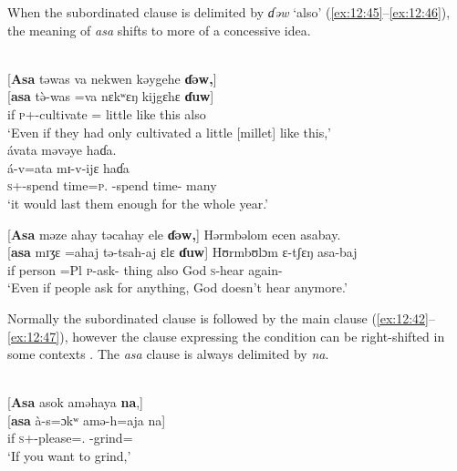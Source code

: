 When the subordinated clause is delimited by \textit{ɗəw} ‘also' (\ref{ex:12:45}--\ref{ex:12:46}), the meaning of \textit{asa} shifts to more of a concessive idea.

\ea \label{ex:12:45}
\\
{}[\textbf{Asa} təwas  va  nekwen  kəygehe  \textbf{ɗəw,}]\\  
\gll  {}[\textbf{asa}  t\`{ə}-was   =va   nɛkʷɛŋ   kijgɛhɛ  \textbf{ɗuw}]\\ 
      if    \textsc{p}+{\PFV}-cultivate  ={\PRF}  little  {like this}  also \\     
\glt ‘Even if they had only cultivated a little [millet] like this,’\\

\medskip
ávata  məvəye  haɗa.\\
\gll á-v=ata mɪ-v-ijɛ haɗa\\
     \textsc{s}+{\IFV}-{spend time}=\textsc{p}.{\IO}  {\NOM}{}-{spend time}-{\CL}  many\\
\glt  ‘it would last them enough for the whole year.’
\z 

\ea \label{ex:12:46}
{}[\textbf{Asa} məze  ahay  təcahay  ele  \textbf{ɗəw,}]  Hərmbəlom  ecen  asabay.\\
\gll  {}[\textbf{asa}  mɪʒɛ   =ahaj   tə-tsah-aj  ɛlɛ       \textbf{ɗuw}]   Hʊrmbʊlɔm ɛ-tʃɛŋ asa-baj\\
      if       person    =Pl        \textsc{p}-ask{}-{\CL} thing  also  God \textsc{s}-hear again-{\NEG}\\
\glt  ‘Even if people ask for anything, God doesn’t hear anymore.’  
\z 

Normally the subordinated clause is followed by the main clause (\ref{ex:12:42}--\ref{ex:12:47}), however the clause expressing the condition can be right-shifted in some contexts . The \textit{asa} clause is always delimited by \textit{na}.

\clearpage
\ea \label{ex:12:47}
\\
{}[\textbf{Asa}  asok  aməhaya  \textbf{na},] \\ 
\gll  {}[\textbf{asa}   à-s=ɔkʷ  amə-h=aja  na]\\ 
      if  \textsc{s}+{\IFV}-please={\twoS}.{\IO}  {\DEP}-grind={\PLU}  {\PSP}\\ 
\glt ‘If you want to grind,’\\

